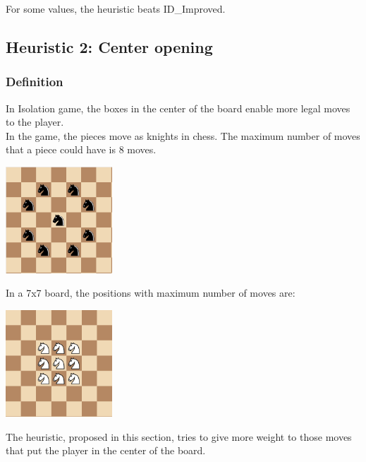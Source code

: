 \documentclass[10pt, a4paper,english]{article}
\begin{document}
For some values, the heuristic beats ID\_Improved.

\subsection{Heuristic 2: Center opening}

\subsubsection{Definition}

In Isolation game, the boxes in the center of the board enable more legal moves to the player. \\ 

In the game, the pieces move as knights in chess. The maximum number of moves that a piece could have is 8 moves. \\ 

\begin{center}
\includegraphics[width=0.3\textwidth]{max_moves.png}\\
\end{center}

In a 7x7 board, the positions with maximum number of moves are: \\

\begin{center}
\includegraphics[width=0.3\textwidth]{center_moves.png}\\
\end{center}

The heuristic, proposed in this section, tries to give more weight to those moves that put the player in the center of the board. \\
\end{document}
